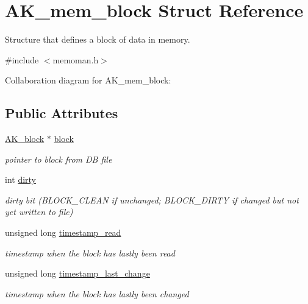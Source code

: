 \hypertarget{structAK__mem__block}{\section{A\+K\+\_\+mem\+\_\+block Struct Reference}
\label{structAK__mem__block}
}


Structure that defines a block of data in memory.  




{\ttfamily \#include $<$memoman.\+h$>$}



Collaboration diagram for A\+K\+\_\+mem\+\_\+block\+:
\subsection*{Public Attributes}
\begin{DoxyCompactItemize}
\item 
\hypertarget{structAK__mem__block_afe6bab88220d9357348e69f812d024b4}{\hyperlink{structAK__block}{A\+K\+\_\+block} $\ast$ \hyperlink{structAK__mem__block_afe6bab88220d9357348e69f812d024b4}{block}}\label{structAK__mem__block_afe6bab88220d9357348e69f812d024b4}

\begin{DoxyCompactList}\small\item\em pointer to block from D\+B file \end{DoxyCompactList}\item 
\hypertarget{structAK__mem__block_a9d5dce682d27f9916b9e42d7ca159e68}{int \hyperlink{structAK__mem__block_a9d5dce682d27f9916b9e42d7ca159e68}{dirty}}\label{structAK__mem__block_a9d5dce682d27f9916b9e42d7ca159e68}

\begin{DoxyCompactList}\small\item\em dirty bit (B\+L\+O\+C\+K\+\_\+\+C\+L\+E\+A\+N if unchanged; B\+L\+O\+C\+K\+\_\+\+D\+I\+R\+T\+Y if changed but not yet written to file) \end{DoxyCompactList}\item 
\hypertarget{structAK__mem__block_a2ad2ddb6c30f91bdff3af10886ab9e7a}{unsigned long \hyperlink{structAK__mem__block_a2ad2ddb6c30f91bdff3af10886ab9e7a}{timestamp\+\_\+read}}\label{structAK__mem__block_a2ad2ddb6c30f91bdff3af10886ab9e7a}

\begin{DoxyCompactList}\small\item\em timestamp when the block has lastly been read \end{DoxyCompactList}\item 
\hypertarget{structAK__mem__block_ad575095cfe45be3ed7f466c4239d6bda}{unsigned long \hyperlink{structAK__mem__block_ad575095cfe45be3ed7f466c4239d6bda}{timestamp\+\_\+last\+\_\+change}}\label{structAK__mem__block_ad575095cfe45be3ed7f466c4239d6bda}

\begin{DoxyCompactList}\small\item\em timestamp when the block has lastly been changed \end{DoxyCompactList}\end{DoxyCompactItemize}


